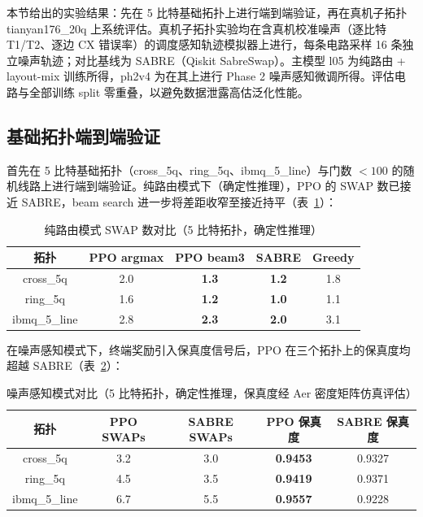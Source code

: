 本节给出\ourwork 的实验结果：先在 5 比特基础拓扑上进行端到端验证，再在真机子拓扑 tianyan176\_20q 上系统评估。真机子拓扑实验均在含真机校准噪声（逐比特 T1/T2、逐边 CX 错误率）的调度感知轨迹模拟器上进行，每条电路采样 16 条独立噪声轨迹；对比基线为 SABRE（Qiskit SabreSwap）。主模型 l05 为纯路由 + layout-mix 训练所得，ph2v4 为在其上进行 Phase 2 噪声感知微调所得。评估电路与全部训练 split 零重叠，以避免数据泄露高估泛化性能。

\subsection{基础拓扑端到端验证}
\label{sec:topo-benchmark}

首先在 5 比特基础拓扑（cross\_5q、ring\_5q、ibmq\_5\_line）与门数 $<100$ 的随机线路上进行端到端验证。纯路由模式下（确定性推理），PPO 的 SWAP 数已接近 SABRE，beam search 进一步将差距收窄至接近持平（表~\ref{tab:route-mode-swap}）：

\begin{table}[htbp]
\centering
\caption{纯路由模式 SWAP 数对比（5 比特拓扑，确定性推理）}
\label{tab:route-mode-swap}
\small
\begin{tabular}{c|cccc}
\hline
拓扑 & PPO argmax & PPO beam3 & SABRE & Greedy \\
\hline
cross\_5q & 2.0 & \textbf{1.3} & \textbf{1.2} & 1.8 \\
ring\_5q & 1.6 & \textbf{1.2} & \textbf{1.0} & 1.1 \\
ibmq\_5\_line & 2.8 & \textbf{2.3} & \textbf{2.0} & 3.1 \\
\hline
\end{tabular}
\end{table}

在噪声感知模式下，终端奖励引入保真度信号后，PPO 在三个拓扑上的保真度均超越 SABRE（表~\ref{tab:noise-aware-fid}）：

\begin{table}[htbp]
\centering
\caption{噪声感知模式对比（5 比特拓扑，确定性推理，保真度经 Aer 密度矩阵仿真评估）}
\label{tab:noise-aware-fid}
\small
\begin{tabular}{c|cc|cc}
\hline
拓扑 & PPO SWAPs & SABRE SWAPs & PPO 保真度 & SABRE 保真度 \\
\hline
cross\_5q & 3.2 & 3.0 & \textbf{0.9453} & 0.9327 \\
ring\_5q & 4.5 & 3.5 & \textbf{0.9419} & 0.9371 \\
ibmq\_5\_line & 6.7 & 5.5 & \textbf{0.9557} & 0.9228 \\
\hline
\end{tabular}
\end{table}

